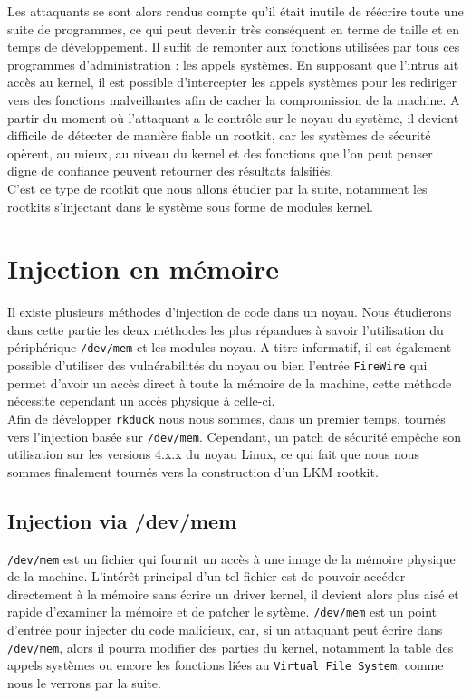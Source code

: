 \documentclass[12pt]{article}
\begin{document}
    Les attaquants se sont alors rendus compte qu'il était inutile de réécrire toute une suite de programmes, ce qui peut devenir très conséquent en terme de taille et en temps de développement. Il suffit de remonter aux fonctions utilisées par tous ces programmes d'administration : les appels systèmes. En supposant que l'intrus ait accès au kernel, il est possible d'intercepter les appels systèmes pour les rediriger vers des fonctions malveillantes afin de cacher la compromission de la machine. A partir du moment où l'attaquant a le contrôle sur le noyau du système, il devient difficile de détecter de manière fiable un rootkit, car les systèmes de sécurité opèrent, au mieux, au niveau du kernel et des fonctions que l'on peut penser digne de confiance peuvent retourner des résultats falsifiés. \\
    C'est ce type de rootkit que nous allons étudier par la suite, notamment les rootkits s'injectant dans le système sous forme de modules kernel\cite{suterusu}.



\section{Injection en mémoire}

    Il existe plusieurs méthodes d'injection de code dans un noyau. Nous étudierons dans cette partie les deux méthodes les plus répandues à savoir l'utilisation du périphérique \texttt{/dev/mem}\cite{devmem} et les modules noyau. A titre informatif, il est également possible d'utiliser des vulnérabilités du noyau ou bien l'entrée \texttt{FireWire} qui permet d'avoir un accès direct à toute la mémoire de la machine, cette méthode nécessite cependant un accès physique à celle-ci.\\

    Afin de développer \texttt{rkduck} nous nous sommes, dans un premier temps, tournés vers l'injection basée sur \texttt{/dev/mem}. Cependant, un patch de sécurité empêche son utilisation sur les versions 4.x.x du noyau Linux, ce qui fait que nous nous sommes finalement tournés vers la construction d'un LKM rootkit.

    \subsection{Injection via /dev/mem}
    
        \texttt{/dev/mem} est un fichier qui fournit un accès à une image de la mémoire physique de la machine. L'intérêt principal d'un tel fichier est de pouvoir accéder directement à la mémoire sans écrire un driver kernel, il devient alors plus aisé et rapide d'examiner la mémoire et de patcher le sytème. \texttt{/dev/mem} est un point d'entrée pour injecter du code malicieux\cite{hackin9}\cite{sstic}, car, si un attaquant peut écrire dans \texttt{/dev/mem}, alors il pourra modifier des parties du kernel, notamment la table des appels systèmes ou encore les fonctions liées au \texttt{Virtual File System}, comme nous le verrons par la suite.\\
        
\end{document}
